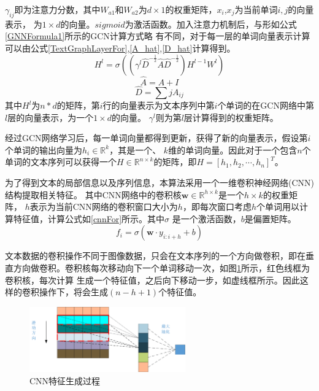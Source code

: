 $\gamma_{ij}$即为注意力分数，其中$W_{a1}$和$W_{a2}$为$d\times 1$的权重矩阵，$x_i$,$x_j$为当前单词$i,j$的向量表示，
为$1\times d$的向量。$sigmoid$为激活函数。加入注意力机制后，与形如公式\ref{GNNFormula1}所示的GCN计算方式略
有不同，对于每一层的单词向量表示计算可以由公式\ref{TextGraphLayerFor},\ref{A_hat},\ref{D_hat}计算得到。
\begin{equation}\label{TextGraphLayerFor}
    H^l=\sigma((\gamma ^l\hat{D}^{-\frac{1}{2}}\hat{A}\hat{D}^{-\frac{1}{2}})H^{l-1}W^l)
\end{equation}
\begin{equation}\label{A_hat}
    \hat{A} = A+I
\end{equation}
\begin{equation}\label{D_hat}
    \hat{D} = \sum{j}A_{ij}
\end{equation}
其中$H^l$为$n*d$的矩阵，第$i$行的向量表示为文本序列中第$i$个单词的在GCN网络中第$l$层的向量表示，为一个$1\times d$的向量。
$\gamma ^l$则为第$l$层计算得到的权重矩阵。

经过GCN网络学习后，每一单词向量都得到更新，获得了新的向量表示，假设第$i$个单词的输出向量为$h_i\in \mathbb{R}^k$，其是一个、
$k$维的单词向量。因此对于一个包含$n$个单词的文本序列可以获得一个$H\in \mathbb{R}^{n\times k}$的矩阵，即$H=[h_1, h_2,\cdots, h_n]^T$。

为了得到文本的局部信息以及序列信息，本算法采用一个一维卷积神经网络(CNN)结构提取相关特征。
其中CNN网络中的卷积核$\mathbf{w} \in \mathbb{R}^{h\times k}$是一个$h \times k$的权重矩阵，
$h$表示为当前CNN网络的卷积窗口大小为$h$，即每次窗口考虑$h$个单词用以计算特征值，计算公式如\ref{cnnFor}所示。其中$\sigma$
是一个激活函数，$b$是偏置矩阵。
\begin{equation}\label{cnnFor}
    f_i=\sigma(\mathbf{w} \cdot y_{i:i+h}+b)
\end{equation}

文本数据的卷积操作不同于图像数据，只会在文本序列的一个方向做卷积，即在垂直方向做卷积。卷积核每次移动向下一个单词移动一次，如图\ref{cnnslide}所示，红色线框为卷积核，每次计算
生成一个特征值，之后向下移动一步，如虚线框所示。因此这样的卷积操作下，将会生成$(n-h+1)$个特征值。
\begin{figure}[htb]
    \setlength{\belowcaptionskip}{0pt}
    \centering
    \includegraphics[width=0.6\textwidth]{pic/cnnslide.png}
    \caption{CNN特征生成过程}
    \label{cnnslide}
\end{figure}

